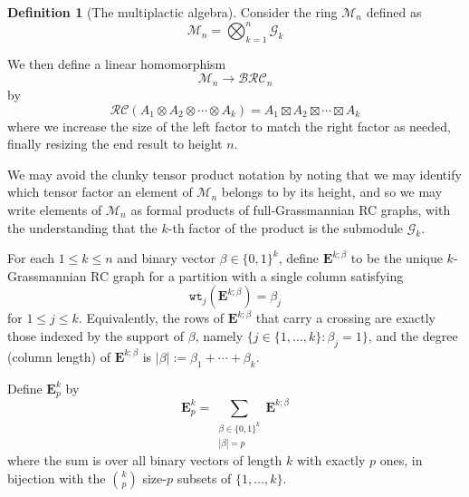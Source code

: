 \documentclass{amsart}
\theoremstyle{definition}
\newtheorem{definition}[lemma]{Definition}
\theoremstyle{remark}
\numberwithin{equation}{subsection}
\newcommand{\wtt}{\mathtt{wt}}
\newcommand{\grass}{\mathcal{G}}
\newcommand{\hr}{\mathtt{ht}}
\newcommand{\BRC}{\mathcal{BRC}}
\newcommand{\RC}{\mathcal{RC}}
\begin{document}
\begin{definition}[The multiplactic algebra]
Consider the ring $\mathcal{M}_n$ defined as
$$\mathcal{M}_n = \bigotimes_{k=1}^n \grass_k$$

We then define a linear homomorphism
$$\mathcal{M}_n\to \BRC_n$$
by
$$\RC(A_1\otimes A_2\otimes \cdots \otimes A_k) = A_1\boxtimes A_2\boxtimes \cdots \boxtimes A_k$$
where we increase the size of the left factor to match the right factor as needed, finally resizing the end result to height $n$.

We may avoid the clunky tensor product notation by noting that we may identify which tensor factor an element of $\mathcal{M}_n$ belongs to by its height, and so we may write elements of $\mathcal{M}_n$ as formal products of full-Grassmannian RC graphs, with the understanding that the $k$-th factor of the product is the submodule $\grass_k$.

For each $1\leq k\leq n$ and binary vector $\beta\in\{0,1\}^k$, define $\mathbf{E}^{k;\beta}$ to be the unique $k$-Grassmannian RC graph for a partition with a single column satisfying
$$\wtt_j(\mathbf{E}^{k;\beta}) = \beta_j$$
for $1\leq j\leq k$. Equivalently, the rows of $\mathbf{E}^{k;\beta}$ that carry a crossing are exactly those indexed by the support of $\beta$, namely $\{j\in\{1,\ldots,k\}:\beta_j=1\}$, and the degree (column length) of $\mathbf{E}^{k;\beta}$ is $|\beta|:=\beta_1+\cdots+\beta_k$.

Define $\mathbf{E}_{p}^k$ by
$$\mathbf{E}_{p}^k = \sum_{\substack{\beta\in\{0,1\}^k\\ |\beta|=p}} \mathbf{E}^{k;\beta}$$
where the sum is over all binary vectors of length $k$ with exactly $p$ ones, in bijection with the $\binom{k}{p}$ size-$p$ subsets of $\{1,\ldots,k\}$.
\end{definition}
\end{document}
